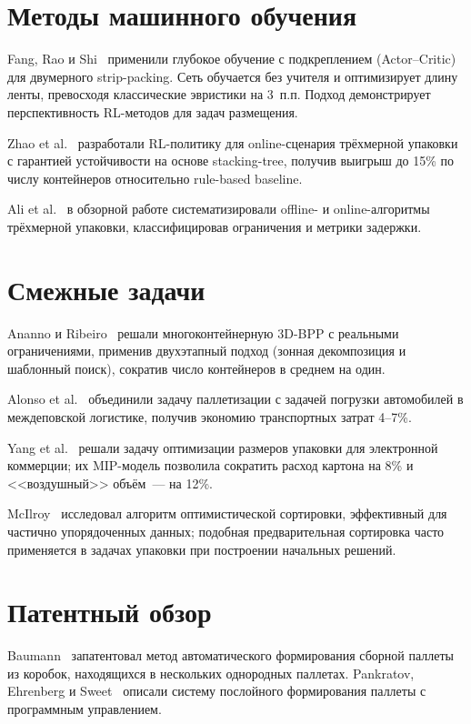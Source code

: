 \section{Методы машинного обучения}

Fang, Rao и Shi~\cite{Fang2023} применили глубокое обучение с подкреплением (Actor--Critic) для двумерного strip-packing. Сеть обучается без учителя и оптимизирует длину ленты, превосходя классические эвристики на 3~п.п. Подход демонстрирует перспективность RL-методов для задач размещения.

Zhao et al.~\cite{Zhao2021} разработали RL-политику для online-сценария трёхмерной упаковки с гарантией устойчивости на основе stacking-tree, получив выигрыш до 15\% по числу контейнеров относительно rule-based baseline.

Ali et al.~\cite{Ali2022} в обзорной работе систематизировали offline- и online-алгоритмы трёхмерной упаковки, классифицировав ограничения и метрики задержки.

\section{Смежные задачи}

Ananno и Ribeiro~\cite{Ananno2024} решали многоконтейнерную 3D-BPP с реальными ограничениями, применив двухэтапный подход (зонная декомпозиция и шаблонный поиск), сократив число контейнеров в среднем на один.

Alonso et al.~\cite{Alonso2016} объединили задачу паллетизации с задачей погрузки автомобилей в междеповской логистике, получив экономию транспортных затрат 4--7\%.

Yang et al.~\cite{Yang2023} решали задачу оптимизации размеров упаковки для электронной коммерции; их MIP-модель позволила сократить расход картона на 8\% и <<воздушный>> объём~--- на 12\%.

McIlroy~\cite{TimSort_teor} исследовал алгоритм оптимистической сортировки, эффективный для частично упорядоченных данных; подобная предварительная сортировка часто применяется в задачах упаковки при построении начальных решений.

\section{Патентный обзор}

Baumann~\cite{USPatent8423178B2} запатентовал метод автоматического формирования сборной паллеты из коробок, находящихся в нескольких однородных паллетах. Pankratov, Ehrenberg и Sweet~\cite{US11613434B2} описали систему послойного формирования паллеты с программным управлением.
